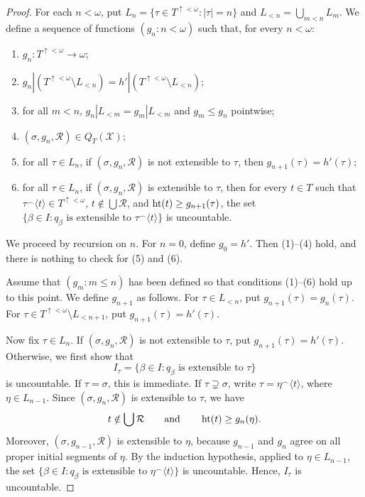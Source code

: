 \begin{proof}
For each $n<\omega$, put
$L_n=\{\tau\in T^{\uparrow<\omega}:|\tau|=n\}$ and
$L_{<n}=\bigcup_{m<n}L_m$.
We define a sequence of functions $(g_n:n<\omega)$ such that, for every
$n<\omega$:
\begin{enumerate}[label=(\arabic*)]
    \item $g_n:T^{\uparrow<\omega}\to\omega$;
    \item $g_n|(T^{\uparrow<\omega}\setminus L_{<n})=h'|(T^{\uparrow<\omega}\setminus L_{<n})$;
    \item for all $m<n$, $g_n|L_{<m}=g_m|L_{<m}$ and $g_m\leq g_n$ pointwise;
    \item $(\sigma, g_n,\mathcal R)\in Q_T(\mathcal X)$;
    \item for all $\tau \in L_n$, if $(\sigma,g_n,\mathcal R)$ is not extensible to $\tau$, then $g_{n+1}(\tau)=h'(\tau)$;
    \item for all $\tau \in L_n$, if $(\sigma,g_n,\mathcal R)$ is extensible to $\tau$, then for every $t\in T$ such that
    $\tau^\frown\langle t\rangle\in T^{\uparrow<\omega}$,
    $t\notin\bigcup\mathcal R$, and
    $\operatorname{ht}(t)\geq g_{n+1}(\tau)$, the set
    $\{\beta\in I:q_\beta\text{ is extensible to }\tau^\frown\langle t\rangle\}$ is uncountable.
\end{enumerate}

We proceed by recursion on $n$.
For $n=0$, define $g_0=h'$.  Then (1)--(4) hold, and there is nothing to check for (5) and (6).

Assume that $(g_m:m\leq n)$ has been defined so that conditions (1)--(6) hold up to this point.
We define $g_{n+1}$ as follows.
For $\tau \in L_{<n}$, put $g_{n+1}(\tau)=g_n(\tau)$.
For $\tau \in T^{\uparrow<\omega}\setminus L_{<n+1}$, put $g_{n+1}(\tau)=h'(\tau)$.

Now fix $\tau\in L_n$.  If $(\sigma,g_n,\mathcal R)$ is not extensible to
$\tau$, put $g_{n+1}(\tau)=h'(\tau)$.  Otherwise, we first show that
\[
  I_\tau=\{\beta\in I:q_\beta\text{ is extensible to }\tau\}
\]
is uncountable.  If $\tau=\sigma$, this is immediate.  If
$\tau\supsetneq\sigma$, write $\tau=\eta^\frown\langle t\rangle$, where
$\eta\in L_{n-1}$.  Since $(\sigma,g_n,\mathcal R)$ is extensible to $\tau$,
we have
\[
  t\notin\bigcup\mathcal R
  \qquad\text{and}\qquad
  \operatorname{ht}(t)\geq g_n(\eta).
\]
Moreover, $(\sigma,g_{n-1},\mathcal R)$ is extensible to $\eta$, because
$g_{n-1}$ and $g_n$ agree on all proper initial segments of $\eta$.
By the induction hypothesis, applied to $\eta\in L_{n-1}$, the set
$\{\beta\in I:q_\beta\text{ is extensible to }\eta^\frown\langle t\rangle\}$
is uncountable. 
Hence, $I_\tau$ is uncountable.


\end{proof}
